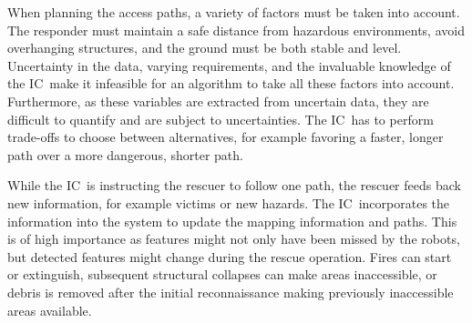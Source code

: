 \documentclass[conference,10pt,letter]{IEEEtran}
\def\IC{IC}
\begin{document}
When planning the access paths, a variety of factors must be taken into account. The responder must maintain a safe distance from hazardous environments, avoid overhanging structures, and the ground must be both stable and level. Uncertainty in the data, varying requirements, and the invaluable knowledge of the \IC\ make it infeasible for an algorithm to take all these factors into account. Furthermore, as these variables are extracted from uncertain data, they are difficult to quantify and are subject to uncertainties. The \IC\ has to perform trade-offs to choose between alternatives, for example favoring a faster, longer path over a more dangerous, shorter path.

While the \IC\ is instructing the rescuer to follow one path, the rescuer feeds back new information, for example victims or new hazards. The \IC\ incorporates the information into the system to update the mapping information and paths. This is of high importance as features might not only have been missed by the robots, but detected features might change during the rescue operation. Fires can start or extinguish, subsequent structural collapses can make areas inaccessible, or debris is removed after the initial reconnaissance making previously inaccessible areas available. %

\end{document}
